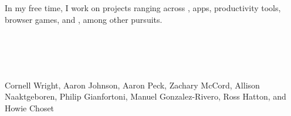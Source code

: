 \section{}
In my free time, I work on projects ranging across ,
 apps, productivity tools, browser games, and , among other pursuits.

\begin{formatb}
  \\
  \body\\
\end{formatb}

\section{}

Cornell Wright, Aaron Johnson, Aaron Peck, Zachary McCord, Allison Naaktgeboren, Philip Gianfortoni, Manuel Gonzalez-Rivero, Ross Hatton, and Howie Choset



